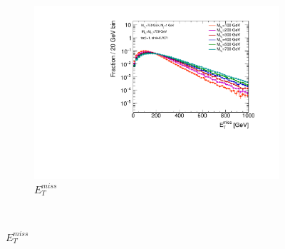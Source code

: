 \begin{figure}
  \centering
  
  \begin{subfigure}[b]{0.7\textwidth}
    \includegraphics[width=\textwidth]{texinputs/04_grid/figures/DMHF/benchmarking/MDM_1_MA_750_sinp_0.7071_tanb_1.0_SCAN_Ma/metlog.pdf}
    \caption{$E_{T}^{miss}$}
  \end{subfigure}\\
  

\end{figure}
